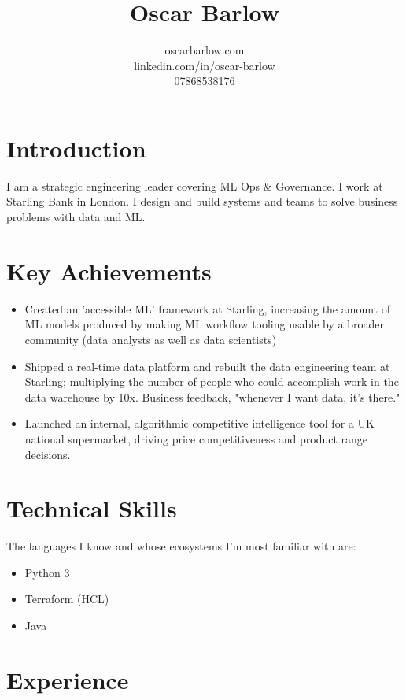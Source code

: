 \documentclass[a4paper]{scrartcl}
\date{}
\begin{document}
\title{Oscar Barlow}
\subtitle{oscarbarlow.com\\linkedin.com/in/oscar-barlow\\07868538176}
\maketitle

\section*{Introduction}
I am a strategic engineering leader covering ML Ops \& Governance. I work at
Starling Bank in London. I design and build systems and teams to solve business
problems with data and ML.

\section*{Key Achievements}
\begin{itemize}
      \item Created an 'accessible ML' framework at Starling, increasing the
            amount of ML models produced by making ML workflow tooling usable by
            a broader community (data analysts as well as data scientists)
      \item Shipped a real-time data platform and rebuilt the data engineering
            team at Starling; multiplying the number of people who could accomplish work in
            the data warehouse by 10x. Business feedback, "whenever I want data, it's
            there."
      \item Launched an internal, algorithmic competitive intelligence tool for
            a UK national supermarket, driving price competitiveness and product
            range decisions.
\end{itemize}

\section*{Technical Skills}
The languages I know and whose ecosystems I'm most familiar with are:
\begin{itemize}
      \item Python 3
      \item Terraform (HCL)
      \item Java
\end{itemize}

\section*{Experience}
\end{document}
